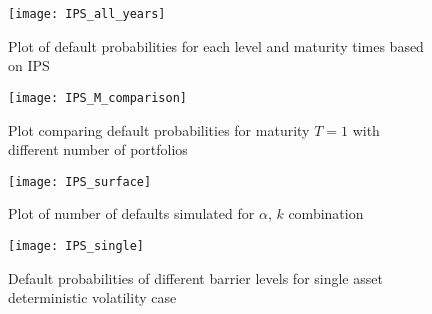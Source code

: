 \begin{figure}
	\centering
	\texttt{[image: IPS\_all\_years]}
	\caption{Plot of default probabilities for each level and maturity times
	based on IPS}
	\label{fig:IPS_all}
\end{figure}

\begin{figure}
	\centering
	\texttt{[image: IPS\_M\_comparison]}
	\caption{Plot comparing default probabilities for maturity $T=1$ with
	different number of portfolios}
	\label{fig:IPS_comparison}
\end{figure}

\begin{figure}
	\centering
	\texttt{[image: IPS\_surface]}
	\caption{Plot of number of defaults simulated for $\alpha$, $k$ combination}
	\label{fig:IPS_surface}
\end{figure}

\begin{figure}
	\centering
	\texttt{[image: IPS\_single]}
	\caption{Default probabilities of different barrier levels for single asset
	deterministic volatility case}
	\label{fig:IPS_single}
\end{figure}
